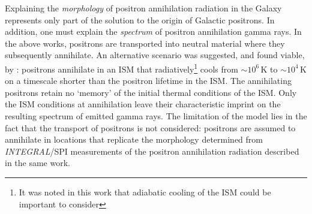 \documentclass[a4paper,fleqn,usenatbib]{mnras}
\begin{document}
Explaining the \textit{morphology} of positron annihilation radiation in the Galaxy represents only part of the solution to the origin of Galactic positrons. In addition, one must explain the \textit{spectrum} of positron annihilation gamma rays. In the above works, positrons are transported into neutral material where they subsequently annihilate. An alternative scenario was suggested, and found viable, by \cite{Churazov11}: positrons annihilate in an ISM that radiatively\footnote{It was noted in this work that adiabatic cooling of the ISM could be important to consider} cools from $\sim10^6\,\mathrm{K}$ to $\sim10^4\,\mathrm{K}$ on a timescale shorter than the positron lifetime in the ISM. The annihilating positrons retain no `memory' of the initial thermal conditions of the ISM. Only the ISM conditions at annihilation leave their characteristic imprint on the resulting spectrum of emitted gamma rays. The limitation of the \cite{Churazov11} model lies in the fact that the transport of positrons is not considered: positrons are assumed to annihilate in locations that replicate the morphology determined from \textit{INTEGRAL}/SPI measurements of the positron annihilation radiation described in the same work.\\
\end{document}
